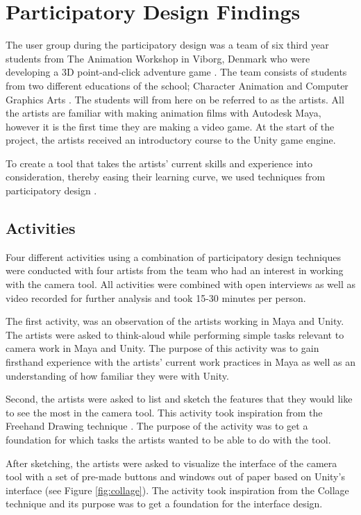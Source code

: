 \section{Participatory Design Findings}
The user group during the participatory design was a team of six third year students from The Animation Workshop in Viborg, Denmark who were developing a 3D point-and-click adventure game \cite{adventure_genre}.  The team consists of students from two different educations of the school; Character Animation and Computer Graphics Arts \cite{taw_degrees}. The students will from here on be referred to as the artists.
All the artists are familiar with making animation films with Autodesk Maya, however it is the first time they are making a video game. At the start of the project, the artists received an introductory course to the Unity game engine.

To create a tool that takes the artists' current skills and experience into consideration, thereby easing their learning curve, we used techniques from participatory design \cite{part_design}.

\subsection{Activities}
Four different activities using a combination of participatory design techniques were conducted with four artists from the team who had an interest in working with the camera tool. All activities were combined with open interviews as well as video recorded for further analysis and took 15-30 minutes per person.

The first activity, was an observation \cite{part_design} of the artists working in Maya and Unity. The artists were asked to think-aloud \cite{part_design} while performing simple tasks relevant to camera work in Maya and Unity. The purpose of this activity was to gain firsthand experience with the artists' current work practices in Maya as well as an understanding of how familiar they were with Unity.

Second, the artists were asked to list and sketch the features that they would like to see the most in the camera tool. This activity took inspiration from the Freehand Drawing technique \cite{part_design}. The purpose of the activity was to get a foundation for which tasks the artists wanted to be able to do with the tool.

After sketching, the artists were asked to visualize the interface of the camera tool with a set of pre-made buttons and windows out of paper based on Unity's interface (see Figure \ref{fig:collage}). The activity took inspiration from the Collage technique \cite{part_design} and its purpose was to get a foundation for the interface design.

